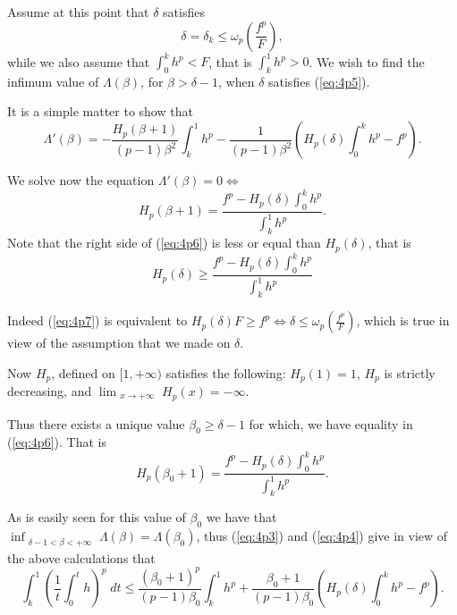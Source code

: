 \documentclass{article}
\numberwithin{equation}{section}
\theoremstyle{definition}
\theoremstyle{remark}
\begin{document}
Assume at this point that $\delta$ satisfies
\begin{equation} \label{eq:4p5}
\delta=\delta_k\leq \omega_p\left( \frac{f^p}{F}\right),
\end{equation}
while we also assume that $\int_0^k h^p<F$, that is $\int_k^1 h^p > 0$.
We wish to find the infimum value of $\Lambda(\beta)$, for $\beta>\delta-1$, when $\delta$ satisfies (\ref{eq:4p5}).

It is a simple matter to show that
\[
\Lambda'(\beta)= -\frac{H_p (\beta+1)}{(p-1)\beta^2}\int_k^1 h^p - \frac{1}{(p-1)\beta^2}\left(H_{p}(\delta) \int_0^k h^p -f^p\right).
\]

We solve now the equation $\Lambda'(\beta)=0 \Leftrightarrow$
\begin{equation}\label{eq:4p6}
H_p(\beta+1)=\frac{f^p-H_{p}(\delta) \int_0^k h^p }{\int_k^1 h^p}.
\end{equation}
Note that the right side of (\ref{eq:4p6}) is less or equal than $H_{p}(\delta)$, that is
\begin{equation} \label{eq:4p7}
H_p(\delta)\geq \frac{f^p-H_{p}(\delta) \int_0^k h^p }{\int_k^1 h^p}
\end{equation}

Indeed (\ref{eq:4p7}) is equivalent to $H_p(\delta)F\geq f^p \Leftrightarrow \delta \leq \omega_p \left(\frac{f^p}{F} \right)$, which is true in view of the assumption that we made on $\delta$.

Now $H_p$, defined on $[1,+\infty)$ satisfies the following:
$H_p(1)=1$, $H_p$ is strictly decreasing, and $\lim_{\substack{x\rightarrow +\infty}} H_p(x)=-\infty$.

Thus there exists a unique value $\beta_0 \geq\delta-1$ for which, we have equality in (\ref{eq:4p6}). That is
\begin{equation} \label{eq:4p8}
H_p(\beta_0+1)= \frac{f^p-H_{p}(\delta) \int_0^k h^p }{\int_k^1 h^p}.
\end{equation}

As is easily seen for this value of $\beta_0$ we have that $\inf_{\substack{\delta-1<\beta<+\infty}} \Lambda(\beta)=\Lambda(\beta_0)$, thus (\ref{eq:4p3}) and (\ref{eq:4p4}) give in view of the above calculations that
\begin{equation} \label{eq:4p9}
\int_k^1 \left( \frac{1}{t} \int_0^t h \right)^p \;dt \leq \frac{(\beta_0+1)^p}{(p-1)\beta_0}\int_k^1 h^p + \frac{\beta_0+1}{(p-1)\beta_0}\left(H_{p}(\delta) \int_0^k h^p-f^p\right).
\end{equation}
\end{document}
